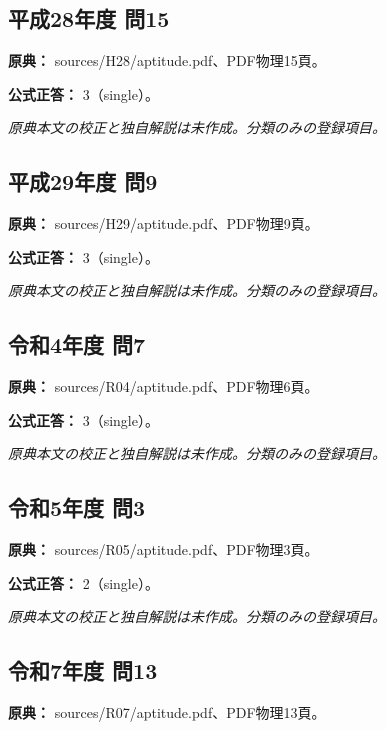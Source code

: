 \subsection{平成28年度 問15}
\label{q:h28-reg-apt-15}

\noindent\textbf{原典：} sources/H28/aptitude.pdf、PDF物理15頁。

\textbf{公式正答：} 3（single）。

\par\textit{原典本文の校正と独自解説は未作成。分類のみの登録項目。}

\subsection{平成29年度 問9}
\label{q:h29-reg-apt-09}

\noindent\textbf{原典：} sources/H29/aptitude.pdf、PDF物理9頁。

\textbf{公式正答：} 3（single）。

\par\textit{原典本文の校正と独自解説は未作成。分類のみの登録項目。}

\subsection{令和4年度 問7}
\label{q:r04-reg-apt-07}

\noindent\textbf{原典：} sources/R04/aptitude.pdf、PDF物理6頁。

\textbf{公式正答：} 3（single）。

\par\textit{原典本文の校正と独自解説は未作成。分類のみの登録項目。}

\subsection{令和5年度 問3}
\label{q:r05-reg-apt-03}

\noindent\textbf{原典：} sources/R05/aptitude.pdf、PDF物理3頁。

\textbf{公式正答：} 2（single）。

\par\textit{原典本文の校正と独自解説は未作成。分類のみの登録項目。}

\subsection{令和7年度 問13}
\label{q:r07-reg-apt-13}

\noindent\textbf{原典：} sources/R07/aptitude.pdf、PDF物理13頁。

